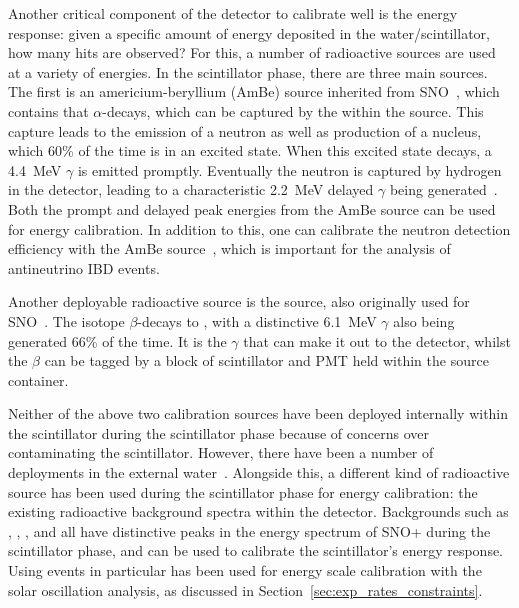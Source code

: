 Another critical component of the detector to calibrate well is the energy response: given a specific amount of energy deposited in the water/scintillator, how many hits are observed? For this, a number of radioactive sources are used at a variety of energies. In the scintillator phase, there are three main sources. The first is an americium-beryllium (AmBe) source inherited from SNO~\cite{}, %
which contains  that $\alpha$-decays, which can be captured by the  within the source. This capture leads to the emission of a neutron as well as production of a  nucleus, which 60\% of the time is in  an excited state. When this excited state decays, a \SI{4.4}{\MeV} $\gamma$ is emitted promptly. Eventually the neutron is captured by hydrogen in the detector, leading to a characteristic \SI{2.2}{\MeV} delayed $\gamma$ being generated~\cite{albaneseSNOExperiment2021}. %
Both the prompt and delayed peak energies from the AmBe source can be used for energy calibration. In addition to this, one can calibrate the neutron detection efficiency with the AmBe source~\cite{}, %
which is important for the analysis of antineutrino IBD events. %

Another deployable radioactive source is the  source, also originally used for SNO~\cite{}. %
The  isotope $\beta$-decays to , with a distinctive \SI{6.1}{\MeV} $\gamma$ also being generated 66\% of the time. It is the $\gamma$ that can make it out to the detector, whilst the $\beta$ can be tagged by a block of scintillator and PMT held within the source container.

Neither of the above two calibration sources have been deployed internally within the scintillator during the scintillator phase because of concerns over contaminating the scintillator. However, there have been a number of deployments in the external water~\cite{}. %
Alongside this, a different kind of radioactive source has been used during the scintillator phase for energy calibration: the existing radioactive background spectra within the detector. Backgrounds such as , , , and  all have distinctive peaks in the energy spectrum of SNO+ during the scintillator phase, and can be used to calibrate the scintillator's energy response. Using  events in particular has been used for energy scale calibration with the solar oscillation analysis, as discussed in Section~\ref{sec:exp_rates_constraints}.

